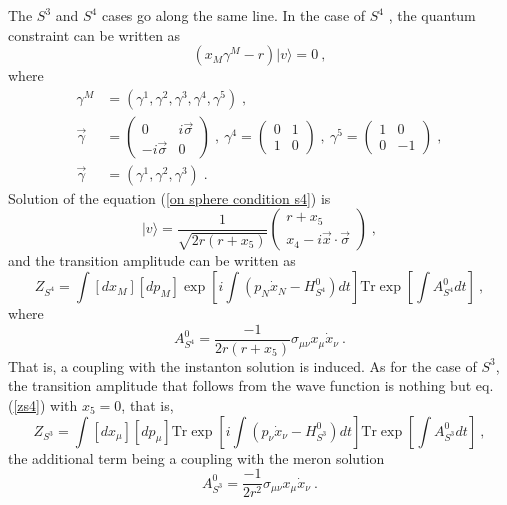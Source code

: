 \documentclass[12pt,a4paper]{article}
\begin{document}
The $S^{3}$ and $S^{4}$ cases go along the same line. In the case of $S^{4}$%
, the quantum constraint can be written as 
\begin{equation}
(x_{M}\gamma ^{M}-r)|v\rangle =0\ ,  \label{on sphere condition s4}
\end{equation}
where 
\begin{equation}
\begin{array}{ll}
\gamma ^{M} & =(\gamma ^{1},\gamma ^{2},\gamma ^{3},\gamma ^{4},\gamma
^{5})\;, \\ 
\vec{\gamma} & =\left( 
\begin{array}{ll}
0 & i\vec{\sigma} \\ 
-i\vec{\sigma} & 0
\end{array}
\right) \;,\ \gamma ^{4}=\left( 
\begin{array}{ll}
0 & 1 \\ 
1 & 0
\end{array}
\right) \;,\ \gamma ^{5}=\left( 
\begin{array}{ll}
1 & 0 \\ 
0 & -1
\end{array}
\right) \;, \\ 
\vec{\gamma} & =(\gamma ^{1},\gamma ^{2},\gamma ^{3})\;.
\end{array}
\end{equation}
Solution of the equation (\ref{on sphere condition s4}) is 
\begin{equation}
|v\rangle ={\frac{1}{\sqrt{2r(r+x_{5})}}}\left( 
\begin{array}{c}
r+x_{5} \\ 
x_{4}-i\vec{x}\cdot \vec{\sigma}
\end{array}
\right) \;,
\end{equation}
and the transition amplitude can be written as 
\begin{equation}
Z_{S^{4}}=\int [dx_{M}][dp_{M}]\exp \left[ i\int \left( p_{N}\dot{x}%
_{N}-H_{S^{4}}^{0}\right) dt\right] \mathrm{Tr}\exp \left[ \int
A_{S^{4}}^{0}dt\right] \ ,  \label{zs4}
\end{equation}
where 
\begin{equation}
A_{S^{4}}^{0}={\frac{-1}{2r(r+x_{5})}}\sigma _{\mu \nu }x_{\mu }\dot{x}_{\nu
}\ .
\end{equation}
That is, a coupling with the instanton solution is induced. As for the case
of $S^{3}$, the transition amplitude that follows from the wave function is
nothing but eq.(\ref{zs4}) with $x_{5}=0$, that is, 
\begin{equation}
Z_{S^{3}}=\int [dx_{\mu }][dp_{\mu }]\mathrm{Tr}\exp \left[ i\int \left(
p_{\nu }\dot{x}_{\nu }-H_{S^{3}}^{0}\right) dt\right] \mathrm{Tr}\exp \left[
\int A_{S^{3}}^{0}dt\right] \ ,
\end{equation}
the additional term being a coupling with the meron solution\cite
{Ikemori:1997fh} 
\begin{equation}
A_{S^{3}}^{0}={\frac{-1}{2r^{2}}}\sigma _{\mu \nu }x_{\mu }\dot{x}_{\nu }\ .
\end{equation}
\end{document}
